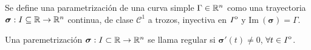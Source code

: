 \begin{definition}
    Se define una parametrizaci\'on de una curva simple $\Gamma\in\mathbb{R}^n$ como una trayectoria $\boldsymbol{\sigma}:I\subseteq\mathbb{R}\to\mathbb{R}^n$ continua, de clase $\mathcal{C}^1$ a trozos, inyectiva en ${\kern0ptI}^{\mathrm{o}}$ y $\text{Im}\:(\boldsymbol{\sigma})=\Gamma$.
\end{definition}

\begin{definition}
    Una paremetrizaci\'on $\boldsymbol{\sigma}:I\subset\mathbb{R}\to\mathbb{R}^n$ se llama regular si $\boldsymbol{\sigma}'(t)\neq0$, $\forall t\in{\kern0ptI}^{\mathrm{o}}$.
\end{definition}